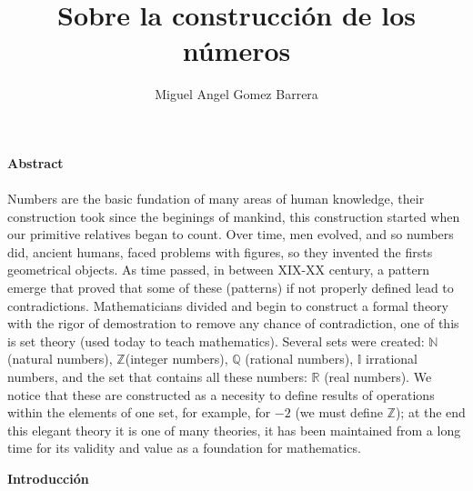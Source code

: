 \documentclass{article}
\title{Sobre la construcción de los números}
\author{Miguel Angel Gomez Barrera}
\begin{document}
\maketitle

\begin{center}\textbf{Abstract}\end{center}
\paragraph{} Numbers are the basic fundation of many areas of human knowledge, their construction took since the beginings of mankind, this construction started when our primitive relatives began to count. Over time, men evolved, and so numbers did, ancient humans, faced problems with figures, so they invented the firsts geometrical objects. As time passed, in between XIX-XX century, a pattern emerge that proved that some of these (patterns) if not properly defined lead to contradictions. Mathematicians divided and begin to construct a formal theory with the rigor of demostration to remove any chance of contradiction, one of this is set theory (used today to teach mathematics). Several sets were created: $\mathbb{N}$(natural numbers), $\mathbb{Z}$(integer numbers), $\mathbb{Q}$ (rational numbers), $\mathbb{I}$ irrational numbers, and the set that contains all these numbers: $\mathbb{R}$ (real numbers). We notice that these are constructed as a necesity to define results of operations within the elements of one set, for example, for $-2$ (we must define $\mathbb{Z}$); at the end this elegant theory it is one of many theories, it has been maintained from a long time for its validity and value as a foundation for mathematics.

\begin{center}\textbf{Introducción}\end{center}
\end{document}
